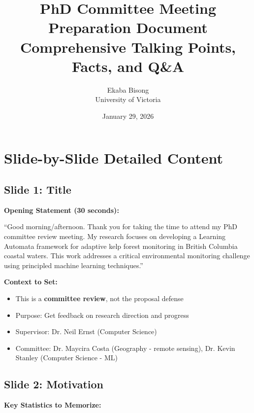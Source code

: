 \documentclass[11pt]{article}
\title{\textbf{PhD Committee Meeting Preparation Document}\\[0.5em]
\large Comprehensive Talking Points, Facts, and Q\&A}
\author{Ekaba Bisong\\University of Victoria}
\date{January 29, 2026}
\begin{document}
\maketitle

\tableofcontents
\newpage

\section{Slide-by-Slide Detailed Content}

\subsection{Slide 1: Title}

\textbf{Opening Statement (30 seconds):}

``Good morning/afternoon. Thank you for taking the time to attend my PhD committee review meeting. My research focuses on developing a Learning Automata framework for adaptive kelp forest monitoring in British Columbia coastal waters. This work addresses a critical environmental monitoring challenge using principled machine learning techniques.''

\textbf{Context to Set:}
\begin{itemize}
    \item This is a \textbf{committee review}, not the proposal defense
    \item Purpose: Get feedback on research direction and progress
    \item Supervisor: Dr. Neil Ernst (Computer Science)
    \item Committee: Dr. Maycira Costa (Geography - remote sensing), Dr. Kevin Stanley (Computer Science - ML)
\end{itemize}

\subsection{Slide 2: Motivation}

\textbf{Key Statistics to Memorize:}
\end{document}
